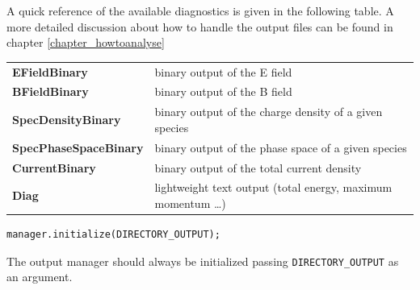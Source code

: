 \documentclass[11pt,a4paper]{report}
\begin{document}
A quick reference of the available diagnostics is given in the following table.
A more detailed discussion about how to handle the output files can be found in chapter \ref{chapter_howtoanalyse}
\begin{center}
    \begin{tabular}{ l | l }
    	\textbf{EFieldBinary} & binary output of the E field\\
    	\textbf{BFieldBinary} & binary output of the B field\\
    	\textbf{SpecDensityBinary} & binary output of the charge density of a given species \\
    	\textbf{SpecPhaseSpaceBinary} & binary output of the phase space of a given species\\
    	\textbf{CurrentBinary} & binary output of the total current density\\
    	\textbf{Diag} & lightweight text output (total energy, maximum momentum \ldots) \\
    \end{tabular}
\end{center}

\begin{lstlisting}[backgroundcolor=\color{no_modify}]
	manager.initialize(DIRECTORY_OUTPUT);
\end{lstlisting}
The output manager should always be initialized passing \verb+DIRECTORY_OUTPUT+
as an argument. 
\end{document}
